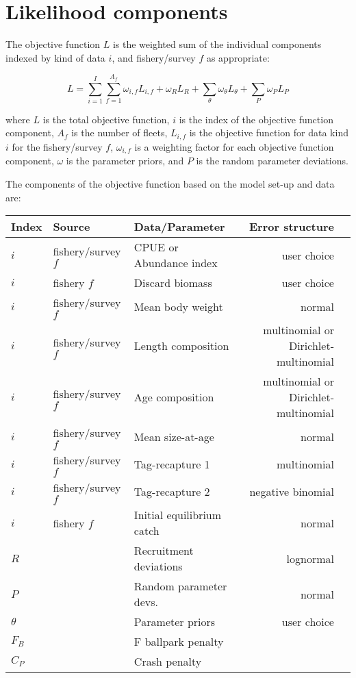\section{Likelihood components}

The objective function $L$ is the weighted sum of the individual components indexed by kind of data $i$, and fishery/survey $f$ as appropriate:

\begin{equation}
	L = \sum_{i=1}^{I}\sum_{f=1}^{A_f}\omega_{i,f} L_{i,f}+\omega_R L_R + \sum_{\theta}^{}\omega_\theta L_\theta + \sum_{P}^{}\omega_P L_P
\end{equation}

where $L$ is the total objective function, $i$ is the index of the objective function component, $A_f$ is the number of fleets, $L_{i,f}$ is the objective function for data kind $i$ for the fishery/survey $f$, $\omega_{i,f}$ is a weighting factor for each objective function component, $\omega$ is the parameter priors, and $P$ is the random parameter deviations.

The components of the objective function based on the model set-up and data are: 

\begin{longtable}{p{1cm} p{3.5cm} p{5.5cm} Rp{5cm}}
	\hline
	Index & Source & Data/Parameter & Error structure\Tstrut\Bstrut\\
	\hline	
	$i$ & fishery/survey $f$ & CPUE or Abundance index & user choice \Tstrut\\
	$i$ & fishery $f$        & Discard biomass         & user choice \Tstrut\\
	$i$ & fishery/survey $f$ & Mean body weight        & normal \Tstrut\\
	$i$ & fishery/survey $f$ & Length composition      & multinomial or Dirichlet-multinomial\Tstrut\\
	$i$ & fishery/survey $f$ & Age composition         & multinomial or Dirichlet-multinomial\Tstrut\\
	$i$ & fishery/survey $f$ & Mean size-at-age        & normal \Tstrut\\
	$i$ & fishery/survey $f$ & Tag-recapture 1         & multinomial \Tstrut\\
	$i$ & fishery/survey $f$ & Tag-recapture 2         & negative binomial\Tstrut\\
	$i$ & fishery $f$        & Initial equilibrium catch & normal \Tstrut\\
	$R$ & 					 & Recruitment deviations  & lognormal \Tstrut\\
	$P$ & 					 & Random parameter devs.  & normal \Tstrut\\
	$\theta$ & 				 & Parameter priors	       & user choice\Tstrut\\
	$F_B$ & 				 & F ballpark penalty	   &  \Tstrut\\
	$C_P$ &				     & Crash penalty           &  \Tstrut\Bstrut\\
	\hline
\end{longtable}

